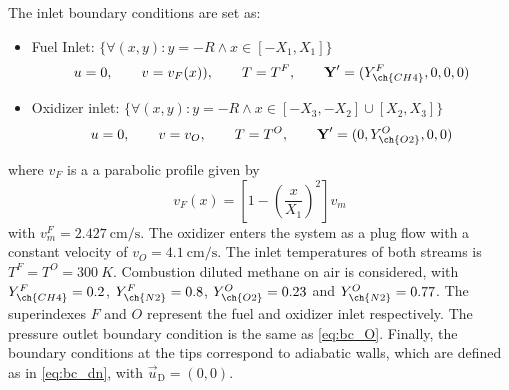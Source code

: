 The inlet boundary conditions are set as: 
\begin{itemize}
\item Fuel Inlet: $\{\forall (x,y): y = -R \land x \in [-X_1,X_1]\} $ \\
\begin{equation*}
	u = 0,\qquad v= v_F(x)), \qquad T = T^F, \qquad \vec{Y}' = (Y^F_{\ch{CH4}},0,0,0)
\end{equation*}
\item Oxidizer inlet: $\{\forall (x,y): y = -R \land x \in [-X_3,-X_2]\cup[X_2,X_3]\}$\\
\begin{equation*}
 	u = 0,\qquad v= v_O, \qquad T = T^O, \qquad \vec{Y}' = (0,Y^O_{\ch{O2}},0,0)
\end{equation*}
\end{itemize}
 where $v_F$ is a a parabolic profile given by
\begin{equation}
	v_F(x) = \left[1-\left(\frac{x}{X_1}\right)^2\right]v_m
\end{equation}
with $v^F_m = \SI{2.427}{\centi \meter \per \second}$. The oxidizer enters the system as a plug flow with a constant velocity of $v_O = \SI{4.1}{\centi \meter \per \second}$. The inlet temperatures of both streams is  $T^F = T^O = \SI{300}{K}$. Combustion diluted methane on air is considered, with $Y^F_{\ch{CH4}} = 0.2$, $Y^F_{\ch{N2}} = 0.8$, $Y^O_{\ch{O2}} = 0.23$ and $Y^O_{\ch{N2}} = 0.77$. The superindexes $F$ and $O$ represent the fuel and oxidizer inlet respectively. The pressure outlet boundary condition is the same as \cref{eq:bc_O}. Finally, the boundary conditions at the tips correspond to adiabatic walls, which are defined as in \cref{eq:bc_dn}, with $\vec{u}_{\text{D}} = (0,0)$.             

